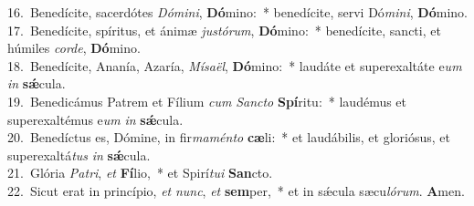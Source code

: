 {16.~}Benedícite, sacerdótes \textit{Dó}\textit{mi}\textit{ni}, \textbf{Dó}mino:~* benedícite, servi Dó\textit{mi}\textit{ni}, \textbf{Dó}mino.\\
{17.~}Benedícite, spíritus, et ánimæ \textit{ju}\textit{stó}\textit{rum}, \textbf{Dó}mino:~* benedícite, sancti, et húmiles \textit{cor}\textit{de}, \textbf{Dó}mino.\\
{18.~}Benedícite, Ananía, Azaría, \textit{Mí}\textit{sa}\textit{ël}, \textbf{Dó}mino:~* laudáte et superexaltáte e\textit{um} \textit{in} \textbf{sǽ}cula.\\
{19.~}Benedicámus Patrem et Fílium \textit{cum} \textit{San}\textit{cto} \textbf{Spí}ritu:~* laudémus et superexaltémus e\textit{um} \textit{in} \textbf{sǽ}cula.\\
{20.~}Benedíctus es, Dómine, in fir\textit{ma}\textit{mén}\textit{to} \textbf{cæ}li:~* et laudábilis, et gloriósus, et superexaltá\textit{tus} \textit{in} \textbf{sǽ}cula.\\
{21.~}Glória \textit{Pa}\textit{tri}, \textit{et} \textbf{Fí}lio,~* et Spirí\textit{tu}\textit{i} \textbf{San}cto.\\
{22.~}Sicut erat in princípio, \textit{et} \textit{nunc}, \textit{et} \textbf{sem}per,~* et in sǽcula sæcu\textit{ló}\textit{rum}. \textbf{A}men.\\
